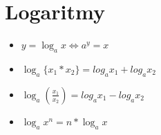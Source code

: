 \documentclass[main.tex]{subfiles}
\begin{document}
\section*{Logaritmy}
\begin{multicols}{2}
  \begin{itemize}
    \item $y=\log_a{x} \Leftrightarrow a^y = x$
    \item $\log_a{\{x_1*x_2\}}=log_a{x_1} + log_a{x_2}$
  \columnbreak
    \item $\log_a{\left(\frac{x_1}{x_2}\right)}=log_a{x_1} - log_a{x_2}$
    \item $\log_a{x^n}=n*\log_a{x}$
  \end{itemize}
\end{multicols}
\end{document}
